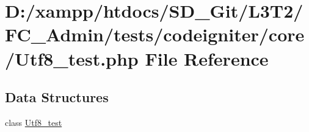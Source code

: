 \hypertarget{_utf8__test_8php}{}\section{D\+:/xampp/htdocs/\+S\+D\+\_\+\+Git/\+L3\+T2/\+F\+C\+\_\+\+Admin/tests/codeigniter/core/\+Utf8\+\_\+test.php File Reference}
\label{_utf8__test_8php}
\subsection*{Data Structures}
\begin{DoxyCompactItemize}
\item 
class \hyperlink{class_utf8__test}{Utf8\+\_\+test}
\end{DoxyCompactItemize}
